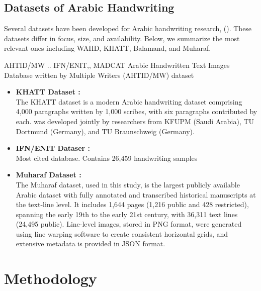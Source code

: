 \documentclass[conference]{IEEEtran}
\begin{document}
\subsection{Datasets of Arabic Handwriting}

Several datasets have been developed for Arabic handwriting research, (). These datasets differ in focus, size, and availability. Below, we summarize the most relevant ones including WAHD, KHATT, Balamand, and Muharaf.



AHTID/MW .. IFN/ENIT,, MADCAT
Arabic Handwritten Text Images Database written by Multiple Writers (AHTID/MW) dataset




\begin{itemize}
  
    \item \textbf{KHATT Dataset \cite{mahmoud2014khatt}:} \\ 
    The KHATT dataset is a modern Arabic handwriting dataset comprising 4,000 paragraphs written by 1,000 scribes, with six paragraphs contributed by each.  was developed jointly by researchers from KFUPM (Saudi Arabia), TU Dortmund (Germany), and TU Braunschweig (Germany). 



    \item \textbf{IFN/ENIT Dataser \cite{mahmoud2014khatt}:} \\
    Most cited database. Contains 26,459 handwriting samples


    \item \textbf{Muharaf Dataset \cite{saeed2024muharaf}:} \\
    The Muharaf dataset, used in this study, is the largest publicly available Arabic dataset with fully annotated and transcribed historical manuscripts at the text-line level. It includes 1,644 pages (1,216 public and 428 restricted), spanning the early 19th to the early 21st century, with 36,311 text lines (24,495 public). Line-level images, stored in PNG format, were generated using line warping software to create consistent horizontal grids, and extensive metadata is provided in JSON format.
  
\end{itemize}


\section{Methodology}
\end{document}

